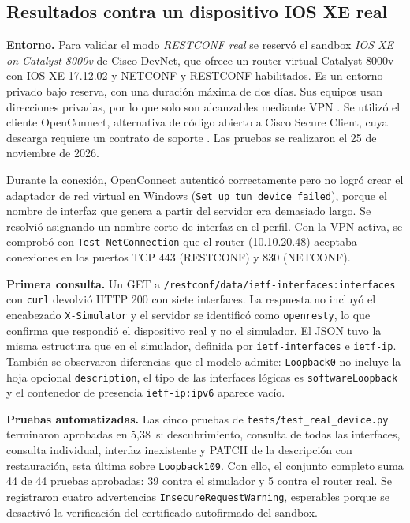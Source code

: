 \subsection{Resultados contra un dispositivo IOS XE real}\label{sec:real}

\textbf{Entorno.} Para validar el modo \textit{RESTCONF real} se reservó el sandbox \textit{IOS XE on Catalyst 8000v} de Cisco DevNet, que ofrece un router virtual Catalyst 8000v con IOS XE 17.12.02 y NETCONF y RESTCONF habilitados. Es un entorno privado bajo reserva, con una duración máxima de dos días. Sus equipos usan direcciones privadas, por lo que solo son alcanzables mediante VPN \parencite{devnet_faq}. Se utilizó el cliente OpenConnect, alternativa de código abierto a Cisco Secure Client, cuya descarga requiere un contrato de soporte \parencite{devnet_faq}. Las pruebas se realizaron el 25 de noviembre de 2026.

Durante la conexión, OpenConnect autenticó correctamente pero no logró crear el adaptador de red virtual en Windows (\texttt{Set up tun device failed}), porque el nombre de interfaz que genera a partir del servidor era demasiado largo. Se resolvió asignando un nombre corto de interfaz en el perfil. Con la VPN activa, se comprobó con \texttt{Test-NetConnection} que el router (10.10.20.48) aceptaba conexiones en los puertos TCP 443 (RESTCONF) y 830 (NETCONF).

\textbf{Primera consulta.} Un GET a \texttt{/restconf/data/ietf-interfaces:interfaces} con \texttt{curl} devolvió HTTP 200 con siete interfaces. La respuesta no incluyó el encabezado \texttt{X-Simulator} y el servidor se identificó como \texttt{openresty}, lo que confirma que respondió el dispositivo real y no el simulador. El JSON tuvo la misma estructura que en el simulador, definida por \texttt{ietf-interfaces} e \texttt{ietf-ip}. También se observaron diferencias que el modelo admite: \texttt{Loopback0} no incluye la hoja opcional \texttt{description}, el tipo de las interfaces lógicas es \texttt{softwareLoopback} y el contenedor de presencia \texttt{ietf-ip:ipv6} aparece vacío.

\textbf{Pruebas automatizadas.} Las cinco pruebas de \texttt{tests/test\_real\_device.py} terminaron aprobadas en 5,38~s: descubrimiento, consulta de todas las interfaces, consulta individual, interfaz inexistente y PATCH de la descripción con restauración, esta última sobre \texttt{Loopback109}. Con ello, el conjunto completo suma 44 de 44 pruebas aprobadas: 39 contra el simulador y 5 contra el router real. Se registraron cuatro advertencias \texttt{InsecureRequestWarning}, esperables porque se desactivó la verificación del certificado autofirmado del sandbox.

